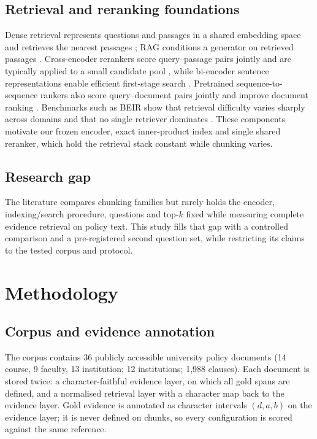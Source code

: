 \documentclass[conference]{IEEEtran}
\begin{document}
\subsection{Retrieval and reranking foundations}
Dense retrieval represents questions and passages in a shared embedding space and retrieves the nearest passages \cite{karpukhin2020dpr}; RAG conditions a generator on retrieved passages \cite{lewis2020rag}. Cross-encoder rerankers score query--passage pairs jointly and are typically applied to a small candidate pool \cite{nogueira2019passage}, while bi-encoder sentence representations enable efficient first-stage search \cite{reimers2019sbert}. Pretrained sequence-to-sequence rankers also score query--document pairs jointly and improve document ranking \cite{nogueira2020document}. Benchmarks such as BEIR show that retrieval difficulty varies sharply across domains and that no single retriever dominates \cite{thakur2021beir}. These components motivate our frozen encoder, exact inner-product index and single shared reranker, which hold the retrieval stack constant while chunking varies.

\subsection{Research gap}
The literature compares chunking families but rarely holds the encoder, indexing/search procedure, questions and top-$k$ fixed while measuring complete evidence retrieval on policy text. This study fills that gap with a controlled comparison and a pre-registered second question set, while restricting its claims to the tested corpus and protocol.

\section{Methodology}
\subsection{Corpus and evidence annotation}
The corpus contains 36 publicly accessible university policy documents (14 course, 9 faculty, 13 institution; 12 institutions; 1,988 clauses). Each document is stored twice: a character-faithful evidence layer, on which all gold spans are defined, and a normalised retrieval layer with a character map back to the evidence layer. Gold evidence is annotated as character intervals $(d,a,b)$ on the evidence layer; it is never defined on chunks, so every configuration is scored against the same reference.
\end{document}
